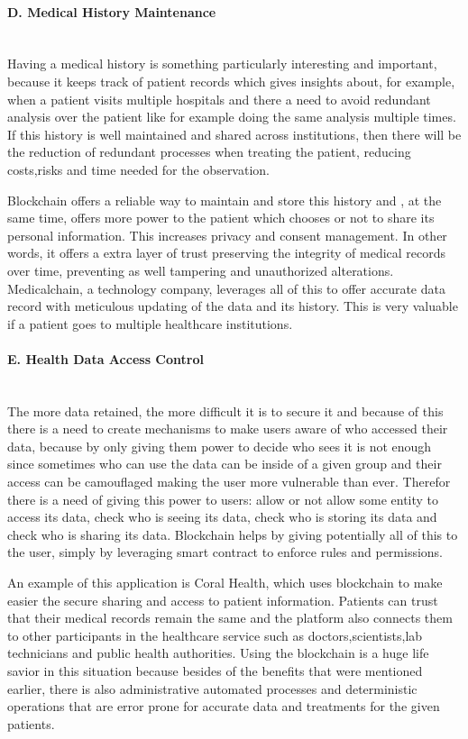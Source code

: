 \paragraph{D. Medical History Maintenance} \mbox{}\\
Having a medical history is something particularly interesting and important, because it keeps track of patient records which gives insights about, for example, when a patient visits multiple hospitals and there a need to avoid redundant analysis over the patient like for example doing the same analysis multiple times. If this history is well maintained and shared across institutions, then there will be the reduction of redundant processes when treating the patient, reducing costs,risks and time needed for the observation.

Blockchain offers a reliable way to maintain and store this history and , at the same time, offers more power to the patient which chooses or not to share its personal information. This increases privacy and consent management. In other words, it offers a extra layer of trust preserving the integrity of medical records over time, preventing as well tampering and unauthorized alterations.
Medicalchain, a technology company, leverages all of this to offer accurate data record with meticulous updating of the data and its history. This is very valuable if a patient goes to multiple healthcare institutions.

\paragraph{E. Health Data Access Control} \mbox{}\\
The more data retained, the more difficult it is to secure it and because of this there is a need to create mechanisms to make users aware of who accessed their data, because by only giving them power to decide who sees it is not enough since sometimes who can use the data can be inside of a given group and their access can be camouflaged making the user more vulnerable than ever. Therefor there is a need of giving this power to users: allow or not allow some entity to access its data, check who is seeing its data, check who is storing its data and check who is sharing its data. Blockchain helps by giving potentially all of this to the user, simply by leveraging smart contract to enforce rules and permissions.

An example of this application is Coral Health, which uses blockchain to make easier the secure sharing and access to patient information. Patients can trust that their medical records remain the same and the platform also connects them to other participants in the healthcare service such as doctors,scientists,lab technicians and public health authorities. Using the blockchain is a huge life savior in this situation because besides of the benefits that were mentioned earlier, there is also administrative automated processes and deterministic operations that are error prone for accurate data and treatments for the given patients.

